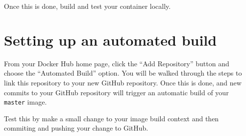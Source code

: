 \documentclass{article}
\begin{document}
Once this is done, build and test your container locally.

\section{Setting up an automated build}
From your Docker Hub home page, click the ``Add Repository'' button and choose the ``Automated Build'' option.  You will be walked through the steps to link this repository to your new GitHub repository.  Once this is done, and new commits to your GitHub repository will trigger an automatic build of your \texttt{master} image.

Test this by make a small change to your image build context and then commiting and pushing your change to GitHub.
\end{document}
